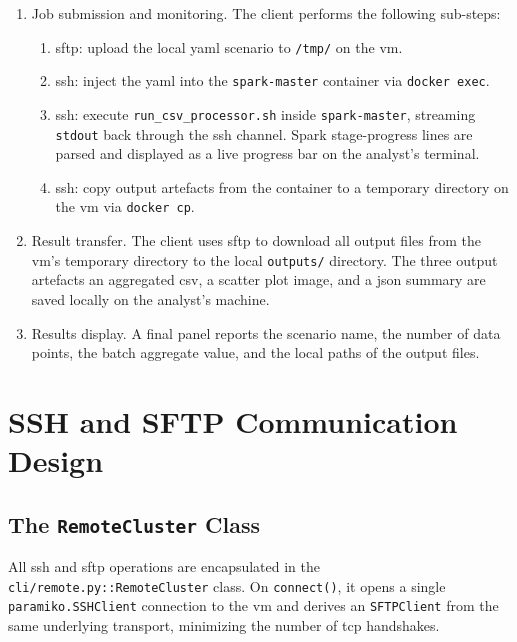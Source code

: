 \begin{enumerate}
\item Job submission and monitoring. The client performs the following sub-steps:
  \begin{enumerate}[label=\alph*.]
    \item \gls{sftp}: upload the local \gls{yaml} scenario to \texttt{/tmp/} on the \gls{vm}.
    \item \gls{ssh}: inject the \gls{yaml} into the \texttt{spark-master} container via
          \texttt{docker exec}.
    \item \gls{ssh}: execute \texttt{run\_csv\_processor.sh} inside \texttt{spark-master},
          streaming \texttt{stdout} back through the \gls{ssh} channel.  Spark stage-progress
          lines are parsed and displayed as a live progress bar on the analyst's terminal.
    \item \gls{ssh}: copy output artefacts from the container to a temporary directory on the
          \gls{vm} via \texttt{docker cp}.
  \end{enumerate}

\item Result transfer. The client uses \gls{sftp} to download all output files from
      the \gls{vm}'s temporary directory to the local \texttt{outputs/} directory.  The three
      output artefacts an aggregated \gls{csv}, a scatter plot image, and a \gls{json}
      summary are saved locally on the analyst's machine.

\item Results display. A final panel reports the scenario name, the number of data
      points, the batch aggregate value, and the local paths of the output files.

\end{enumerate}

\section{SSH and SFTP Communication Design}
\label{sec:rm-ssh-sftp}

\subsection{The \texttt{RemoteCluster} Class}
\label{subsec:rm-remotecluster-class}

\begin{sloppypar}
All \gls{ssh} and \gls{sftp} operations are encapsulated in the
\texttt{cli/remote.py::\allowbreak{}RemoteCluster} class.  On \texttt{connect()}, it opens a single
\texttt{paramiko.SSHClient} connection to the \gls{vm} and derives an \texttt{SFTPClient}
from the same underlying transport, minimizing the number of \gls{tcp} handshakes.
\end{sloppypar}

